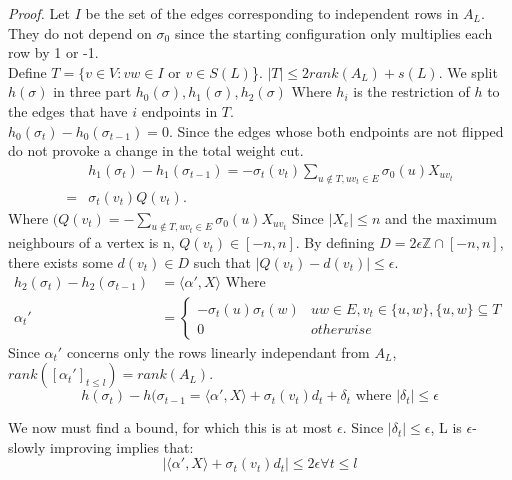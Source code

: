 \documentclass[12pt]{article}
\begin{document}
\textit{Proof.} Let $I$ be the set of the edges corresponding to independent rows in $A_L$. They do not depend on $\sigma_0$ since the starting configuration only multiplies each row by 1 or -1.\\
Define $T = \{v \in V: vw \in I \text{ or } v \in S(L)$\}. $|T| \leq 2 rank(A_L) + s(L)$. 
We split $h(\sigma)$ in three part $h_0(\sigma), h_1(\sigma), h_2(\sigma)$ Where $h_i$ is the restriction of $h$ to the edges that have $i$ endpoints in $T$. \\
$h_0(\sigma_t) - h_0(\sigma_{t -1}) = 0$. Since the edges whose both endpoints are not flipped do not provoke a change in the total weight cut. \\
\begin{equation*}
\begin{split}
&h_1(\sigma_t) - h_1(\sigma_{t-1}) = -\sigma_t(v_t)\sum_{u \not\in T, uv_t \in E}\sigma_0(u)X_{uv_t} \\
=& \sigma_t(v_t)Q(v_t).
\end{split}
\end{equation*}
Where $(Q(v_t) = -\sum_{u \not\in T, uv_t \in E}\sigma_0(u)X_{uv_t}$ Since $|X_e| \leq n$ and the maximum neighbours of a vertex is n, $Q(v_t) \in [-n, n]$. By defining $D = 2\epsilon\mathbb Z \cap [-n, n]$, there exists some $d(v_t) \in D$ such that $|Q(v_t) - d(v_t)| \leq \epsilon$.\\
\begin{equation*}
\begin{split}
h_2(\sigma_t) - h_2(\sigma_{t-1}) &= \langle\alpha ', X \rangle \text{ Where }\\
\alpha_t ' &=  
\begin{cases}
-\sigma_t(u)\sigma_t(w) & uw \in E, v_t \in \{u, w\}, \{u, w\} \subseteq T \\
0 & otherwise
\end{cases}
\end{split}
\end{equation*}
Since $\alpha_t'$ concerns only the rows linearly independant from $A_L$, $rank([\alpha_t']_{t \leq l}) = rank(A_L)$. \\
\begin{equation*}
h(\sigma_t) - h(\sigma_{t-1} = \langle\alpha ', X \rangle +   \sigma_t(v_t)d_t + \delta_t \text{    where }|\delta_t| \leq \epsilon
\end{equation*}

We now must find a bound, for which this is at most $\epsilon$. Since  $|\delta_t| \leq \epsilon$, L is $\epsilon$-slowly improving implies that: 
\begin{equation*}
| \langle\alpha ', X \rangle +   \sigma_t(v_t)d_t| \leq 2\epsilon \forall t \leq l
\end{equation*}
\end{document}
